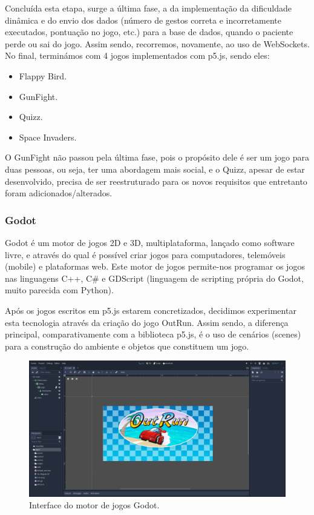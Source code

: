 \documentclass{TTUPhD}
\begin{document}
Concluída esta etapa, surge a última fase, a da implementação da dificuldade dinâmica e do envio dos dados (número de gestos correta e incorretamente executados, pontuação no jogo, etc.) para a base de dados, quando o paciente perde ou sai do jogo. Assim sendo, recorremos, novamente, ao uso de WebSockets.
No final, terminámos com 4 jogos implementados com p5.js, sendo eles:

\begin{itemize}
	\item Flappy Bird.
	\item GunFight.
	\item Quizz.
	\item Space Invaders.
\end{itemize}

O GunFight não passou pela última fase, pois o propósito dele é ser um jogo para duas pessoas, ou seja, ter uma abordagem mais social, e o Quizz, apesar de estar desenvolvido,  precisa de ser reestruturado para os novos requisitos que entretanto foram adicionados/alterados.

\subsubsection{Godot}

Godot é um motor de jogos 2D e 3D, multiplataforma, lançado como software livre, e através do qual é possível criar jogos para computadores, telemóveis (mobile) e plataformas web. Este motor de jogos permite-nos programar os jogos nas linguagens C++, C# e GDScript (linguagem de scripting própria do Godot, muito parecida com Python).

Após os jogos escritos em p5.js estarem concretizados, decidimos experimentar esta tecnologia através da criação do jogo OutRun. Assim sendo, a diferença principal, comparativamente com a biblioteca p5.js, é o uso de cenários (scenes) para a construção do ambiente e objetos que constituem um jogo.

\begin{figure}[h!]
    \center
    \includegraphics[scale=0.25]{./img/inicioGodot.png}
    \caption{Interface do motor de jogos Godot.}
    \label{fig:inicio_godot}
\end{figure}
\end{document}
